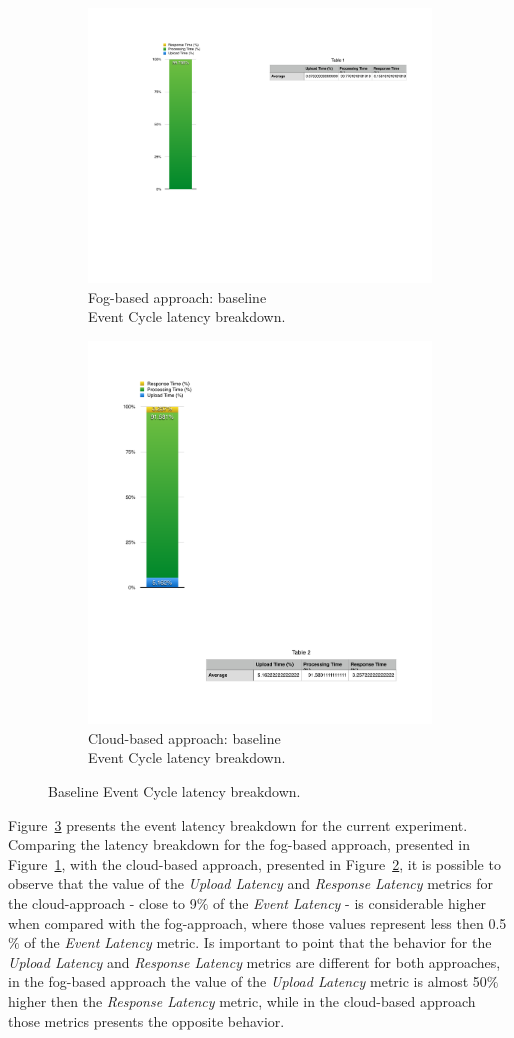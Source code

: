 \begin{figure}[ht!]
  \centering
  \begin{subfigure}{.5\textwidth}
    \centering
    \includegraphics[width=.365\linewidth]{./images/ecspec_local_breakdown}
    \caption{Fog-based approach: baseline\\Event Cycle latency breakdown.}
    \label{fig:ecspec_local}
  \end{subfigure}%
  \begin{subfigure}{.5\textwidth}
    \centering
    \includegraphics[width=.4\linewidth]{./images/ecspec_cloud_breakdown}
    \caption{Cloud-based approach: baseline\\Event Cycle latency breakdown.}
    \label{fig:ecspec_cloud}
  \end{subfigure}
  \caption{Baseline Event Cycle latency breakdown.}
  \label{fig:ecspec_breakdown}
\end{figure}

Figure~\ref{fig:ecspec_breakdown} presents the event latency breakdown for the current experiment.
Comparing the latency breakdown for the fog-based approach, presented in Figure~\ref{fig:ecspec_local},
with the cloud-based approach, presented in Figure~\ref{fig:ecspec_cloud}, it is possible to observe
that the value of the \textit{Upload Latency} and \textit{Response Latency} metrics for the cloud-approach
- close to 9$\%$ of the \textit{Event Latency} - is considerable higher when compared with the fog-approach,
where those values represent less then 0.5$\%$ of the \textit{Event Latency} metric. Is important to
point that the behavior for the \textit{Upload Latency} and \textit{Response Latency} metrics are
different for both approaches, in the fog-based approach the value of the \textit{Upload Latency}
metric is almost 50$\%$ higher then the \textit{Response Latency} metric, while in the cloud-based
approach those metrics presents the opposite behavior.\\

